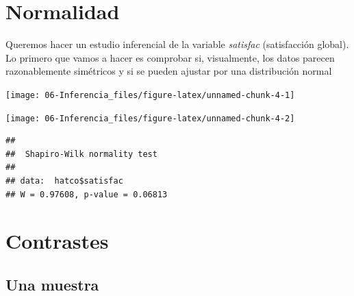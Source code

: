 \documentclass[
]{book}
\newenvironment{Shaded}{\begin{snugshade}}{\end{snugshade}}
\newcommand{\FunctionTok}[1]{\textcolor[rgb]{0.00,0.00,0.00}{#1}}
\newcommand{\NormalTok}[1]{#1}
\newcommand{\SpecialCharTok}[1]{\textcolor[rgb]{0.00,0.00,0.00}{#1}}
\theoremstyle{break}
\begin{document}
\hypertarget{normalidad}{%
\section{Normalidad}\label{normalidad}}

Queremos hacer un estudio inferencial de la variable \emph{satisfac} (satisfacción global). Lo primero
que vamos a hacer es comprobar si, visualmente, los datos parecen razonablemente
simétricos y si se pueden ajustar por una distribución normal

\begin{Shaded}
\end{Shaded}

\begin{center}\texttt{[image: 06-Inferencia\_files/figure-latex/unnamed-chunk-4-1]} \end{center}

\begin{Shaded}
\end{Shaded}

\begin{center}\texttt{[image: 06-Inferencia\_files/figure-latex/unnamed-chunk-4-2]} \end{center}

\begin{Shaded}
\end{Shaded}

\begin{verbatim}
## 
##  Shapiro-Wilk normality test
## 
## data:  hatco$satisfac
## W = 0.97608, p-value = 0.06813
\end{verbatim}

\hypertarget{contrastes}{%
\section{Contrastes}\label{contrastes}}

\hypertarget{una-muestra}{%
\subsection{Una muestra}\label{una-muestra}}
\end{document}
